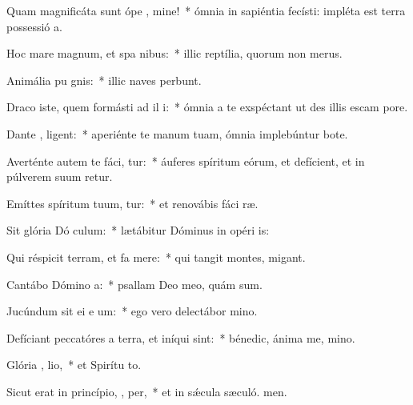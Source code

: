 \item Quam magnificáta sunt ópe , mine!~* ómnia in sapiéntia fecísti: impléta est terra possessió a.
\item Hoc mare magnum, et spa nibus:~* illic reptília, quorum non  merus.
\item Animália pu  gnis:~* illic naves perbunt.
\item Draco iste, quem formásti ad il i:~* ómnia a te exspéctant ut des illis escam  pore.
\item Dante  , ligent:~* aperiénte te manum tuam, ómnia implebúntur bote.
\item Averténte autem te fáci, tur:~* áuferes spíritum eórum, et defícient, et in púlverem suum retur.
\item Emíttes spíritum tuum,  tur:~* et renovábis fáci ræ.
\item Sit glória Dó  culum:~* lætábitur Dóminus in opéri is:
\item Qui réspicit terram, et fa  mere:~* qui tangit montes,  migant.
\item Cantábo Dómino   a:~* psallam Deo meo, quám sum.
\item Jucúndum sit ei e um:~* ego vero delectábor  mino.
\item Defíciant peccatóres a terra, et iníqui    sint:~* bénedic, ánima me, mino.
\item Glória ,  lio,~* et Spirítu to.
\item Sicut erat in princípio,  ,  per,~* et in sǽcula sæculó. men.
